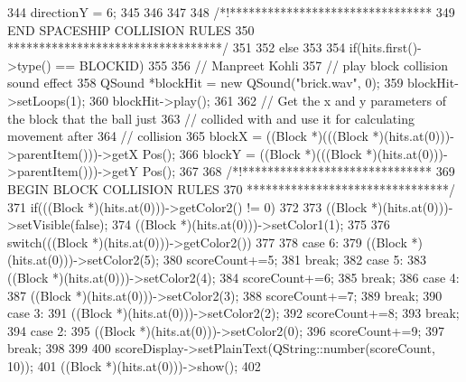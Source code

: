 \begin{DoxyCode}
{{{{{344                     directionY = 6;
345                 }
346             }
347 
348                  /*!********************************
349                     END SPACESHIP COLLISION RULES
350                   **********************************/
351         }
352         else
353         {
354             if(hits.first()->type() == BLOCKID)
355             {
356                 // Manpreet Kohli
357                 // play block collision sound effect
358                 QSound *blockHit = new QSound("brick.wav", 0);
359                 blockHit->setLoops(1);
360                 blockHit->play();
361 
362                 // Get the x and y parameters of the block that the ball just
363                 // collided with and use it for calculating movement after
364                 // collision
365                 blockX = ((Block *)(((Block *)(hits.at(0)))->parentItem()))->getX
      Pos();
366                 blockY = ((Block *)(((Block *)(hits.at(0)))->parentItem()))->getY
      Pos();
367                 
368                 /*!******************************
369                    BEGIN BLOCK COLLISION RULES
370                  ********************************/
371                 if(((Block *)(hits.at(0)))->getColor2() != 0)
372                 {
373                     ((Block *)(hits.at(0)))->setVisible(false);
374                     ((Block *)(hits.at(0)))->setColor1(1);
375 
376                     switch(((Block *)(hits.at(0)))->getColor2())
377                     {
378                     case 6:
379                         ((Block *)(hits.at(0)))->setColor2(5);
380                         scoreCount+=5;
381                         break;
382                     case 5:
383                         ((Block *)(hits.at(0)))->setColor2(4);
384                         scoreCount+=6;
385                         break;
386                     case 4:
387                         ((Block *)(hits.at(0)))->setColor2(3);
388                         scoreCount+=7;
389                         break;
390                     case 3:
391                         ((Block *)(hits.at(0)))->setColor2(2);
392                         scoreCount+=8;
393                         break;
394                     case 2:
395                         ((Block *)(hits.at(0)))->setColor2(0);
396                         scoreCount+=9;
397                         break;
398                     }
399 
400                     scoreDisplay->setPlainText(QString::number(scoreCount, 10));
401                     ((Block *)(hits.at(0)))->show();                    
402                 }
}}}}
\end{DoxyCode}
